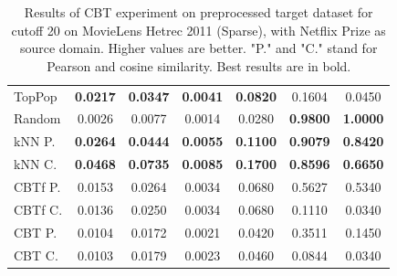 \begin{table}[hbt]
\begin{tabulary}{\textwidth}{|L|CCCCCC|}
\hline
TopPop & \textbf{0.0217} & \textbf{0.0347} & \textbf{0.0041} & \textbf{0.0820} & 0.1604 & 0.0450 \\
Random & 0.0026 & 0.0077 & 0.0014 & 0.0280 & \textbf{0.9800} & \textbf{1.0000} \\
kNN P. & \textbf{0.0264} & \textbf{0.0444} & \textbf{0.0055} & \textbf{0.1100} & \textbf{0.9079} & \textbf{0.8420} \\
kNN C. & \textbf{0.0468} & \textbf{0.0735} & \textbf{0.0085} & \textbf{0.1700} & \textbf{0.8596} & \textbf{0.6650} \\
CBTf P. & 0.0153 & 0.0264 & 0.0034 & 0.0680 & 0.5627 & 0.5340 \\
CBTf C. & 0.0136 & 0.0250 & 0.0034 & 0.0680 & 0.1110 & 0.0340 \\
CBT P. & 0.0104 & 0.0172 & 0.0021 & 0.0420 & 0.3511 & 0.1450 \\
CBT C. & 0.0103 & 0.0179 & 0.0023 & 0.0460 & 0.0844 & 0.0340 \\
\hline
\end{tabulary}
\caption{Results of CBT experiment on preprocessed target dataset for cutoff 20 on MovieLens Hetrec 2011 (Sparse), with Netflix Prize as source domain. Higher values are better. "P." and "C." stand for Pearson and cosine similarity. Best results are in bold.}
\end{table}

